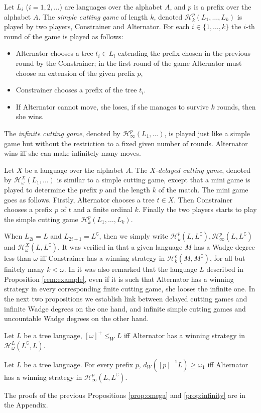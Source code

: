 Let $L_i$ ($i=1,2,\dots$) are languages over the alphabet $A$, and $p$ is a prefix over the alphabet $A$. 
The \emph{simple cutting game} of length $k$, denoted $\mathcal{H}^p_k(L_1,\ldots,L_k)$ is played by two players, Constrainer and Alternator. 
For each $i \in \{1, \dots, k \}$ the $i$-th round of the game is played as follows:
\begin{itemize}
\item Alternator chooses a tree $t_i \in L_i$ extending the prefix chosen in the previous round by the Constrainer; in the first round of the game Alternator must choose an extension of the given prefix $p$,
\item Constrainer chooses a prefix of the tree $t_i$.
\item If Alternator cannot move, she loses, if she manages to survive $k$ rounds, then she wins.
\end{itemize}
The \emph{infinite cutting game}, denoted by $\mathcal{H}^p_\infty(L_1,\dots)$, is played just like a simple game but without the restriction to a fixed given number of rounds. Alternator wins iff she can make infinitely many moves.

Let $X$ be a language over the alphabet $A$.  The \emph{$X$-delayed cutting game}, denoted by 
$\mathcal{H}^{X}_\omega(L_1,\dots)$ is similar to a simple cutting game, except that a mini game is played to determine the prefix $p$ and the length $k$ of the match. 
The mini game goes as follows. Firstly, Alternator chooses a tree $t \in X$. Then Constrainer chooses a prefix $p$ of $t$ and a finite ordinal $k$. Finally the two players starts to play the simple cutting game $\mathcal{H}^p_k(L_1,\dots,L_k)$. 

When $L_{2i}=L$ and $L_{2i+1}=L^\complement$, then we simply write $\mathcal{H}^p_k(L, L^\complement), \mathcal{H}^p_\infty(L, L^\complement)$ and  $\mathcal{H}^{X}_\omega(L, L^\complement)$.
It was verified in \cite{bp} that a given language $M$ has a Wadge degree less than $\omega$ iff Constrainer has a winning strategy in $\mathcal{H}^\varepsilon_k(M, M^\complement)$, for all but finitely many $k<\omega$.
In \cite{bp} it was also remarked that the language $L$ described in Proposition \ref{rem:example}, even  if it is such that Alternator has a winning strategy in every corresponding finite cutting game, she looses the infinite one.
In the next two propositions we establish link between delayed cutting games and infinite Wadge degrees on the one hand, and infinite simple cutting games and uncountable Wadge degrees on the other hand.
\begin{proposition}\label{prop:omega} Let $L$ be a tree language, $[\omega]^+ \leq_W L$ iff Alternator has a winning strategy in $\mathcal{H}^{L}_\omega(L^\complement, L)$. 
\end{proposition}
\begin{proposition}\label{prop:infinity} Let $L$ be a tree language. For every prefix $p$,
$d_W([p]^{-1}L) \geq \omega_1$ iff Alternator has a winning strategy in $\mathcal{H}^p_\infty(L, L^\complement)$. 
\end{proposition}
The proofs of the previous Propositions \ref{prop:omega} and \ref{prop:infinity} are in the Appendix. 

